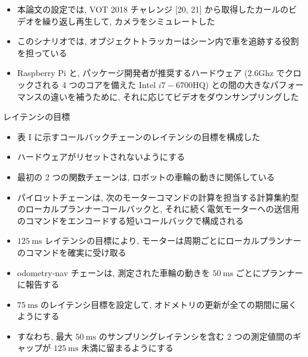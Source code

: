 \begin{frame}{}
    \begin{itemize}
        \item 本論文の設定では, VOT 2018 チャレンジ [20, 21] から取得したカールのビデオを繰り返し再生して, カメラをシミュレートした
\item このシナリオでは, オブジェクトトラッカーはシーン内で車を追跡する役割を担っている
\item Raspberry Pi と, パッケージ開発者が推奨するハードウェア ($2.6 \mathrm{Ghz}$ でクロックされる 4 つのコアを備えた Intel $i 7-6700 \mathrm{HQ}$) との間の大きなパフォーマンスの違いを補うために, それに応じてビデオをダウンサンプリングした
    \end{itemize}
\end{frame}

\begin{frame}{レイテンシの目標}
    \begin{itemize}
        \item 表 I に示すコールバックチェーンのレイテンシの目標を構成した
    \end{itemize}
\end{frame}

\begin{frame}{}
    \begin{itemize}
        \item ハードウェアがリセットされないようにする
\item 最初の 2 つの関数チェーンは, ロボットの車輪の動きに関係している
\item パイロットチェーンは, 次のモーターコマンドの計算を担当する計算集約型のローカルプランナーコールバックと, それに続く電気モーターへの送信用のコマンドをエンコードする短いコールバックで構成される
    \end{itemize}
\end{frame}

\begin{frame}{}
    \begin{itemize}
        \item $125 \mathrm{~ms}$ レイテンシの目標により, モーターは周期ごとにローカルプランナーのコマンドを確実に受け取る
\item odometry-nav チェーンは, 測定された車輪の動きを $50 \mathrm{~ms}$ ごとにプランナーに報告する
\item $75 \mathrm{~ms}$ のレイテンシ目標を設定して, オドメトリの更新が全ての期間に届くようにする
\item すなわち, 最大 $50 \mathrm{~ms}$ のサンプリングレイテンシを含む 2 つの測定値間のギャップが $125 \mathrm{~ms}$ 未満に留まるようにする
    \end{itemize}
\end{frame}

